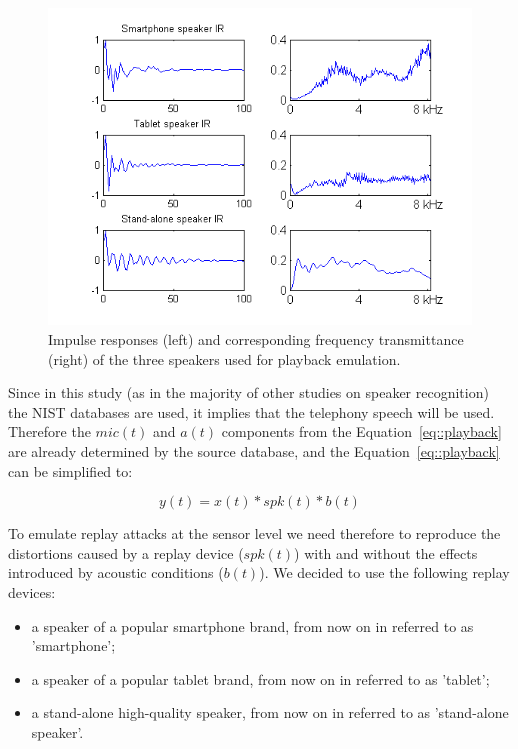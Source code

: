 


\begin{figure}
	\centering
	\includegraphics[width=1\linewidth]{Figs/IRs.png}
	\caption{Impulse responses (left) and corresponding frequency transmittance (right) of the three speakers used for playback emulation.}
	\label{fig::IRs}
\end{figure}

Since in this study (as in the majority of other studies on speaker recognition) the NIST databases are used, it implies that the telephony speech will be used. Therefore the $mic(t)$ and $a(t)$ components from the Equation~\ref{eq::playback} are already determined by the source database, and the Equation~\ref{eq::playback} can be simplified to:

\begin{equation}
y(t) = x(t)* spk(t) * b(t)
\label{eq:playback_simple}
\end{equation}

To emulate replay attacks at the sensor level we need therefore to reproduce the distortions caused by a replay device ($spk(t)$) with and without the effects introduced by acoustic conditions ($b(t)$). We decided to use the following replay devices:

\begin{itemize}
\item a speaker of a popular smartphone brand, from now on in referred to as 'smartphone';
\item a speaker of a popular tablet brand, from now on in referred to as 'tablet';
\item a stand-alone high-quality speaker, from now on in referred to as 'stand-alone speaker'.
\end{itemize}

